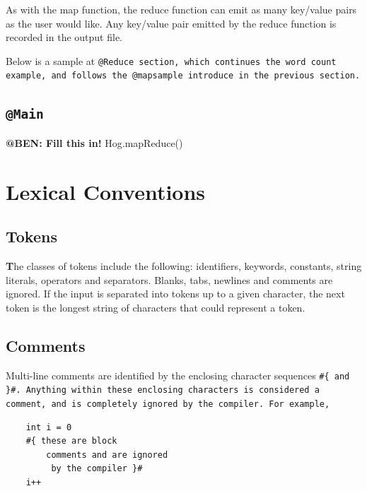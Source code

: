 \documentclass{article}
\begin{document}
As with the map function, the reduce function can emit as many key/value pairs as
the user would like. Any key/value pair emitted by the reduce function is recorded
in the output file.

Below is a sample at \tt @Reduce \rm section, which continues the word count
example, and follows the @mapsample introduce in the previous section.


\subsection{\tt @Main \rm} %
\label{sec:tt_main_rm}

\textbf{@BEN: Fill this in!} Hog.mapReduce()



\section{Lexical Conventions} %
\label{sec:lexical_conventions}

\subsection{Tokens} %
\label{sub:tokens}

\textbf The classes of tokens include the following: identifiers, keywords, constants, string literals, operators and separators. Blanks, tabs, newlines and comments are ignored. If the input is separated into tokens up to a given character, the next token is the longest string of characters that could represent a token.


\subsection{Comments} %
\label{sub:comments}

Multi-line comments are identified by the enclosing character sequences \tt \#\{ \rm and \tt \}\#\rm. Anything within these
enclosing characters is considered a comment, and is completely ignored by the compiler. For example,

\begin{verbatim}
    int i = 0
    #{ these are block
        comments and are ignored
         by the compiler }#
    i++
\end{verbatim}
\end{document}
